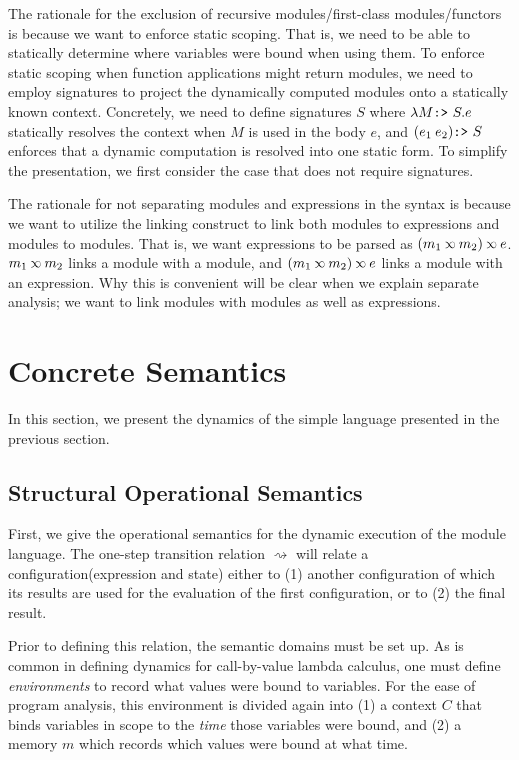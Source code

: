 \documentclass[acmsmall,review]{acmart}\settopmatter{printfolios=true,printccs=false,printacmref=false}
\theoremstyle{definition}
\newcommand*{\mem}{m}
\newcommand*{\semlink}{\mathbin{\rotatebox[origin=c]{180}{$\propto$}}}
\newcommand*{\link}[2]{{#1}\semlink{#2}}
\newcommand*{\project}{\text{\texttt{:>} }}
\begin{document}
The rationale for the exclusion of recursive modules/first-class modules/functors is because we want to enforce static scoping.
That is, we need to be able to statically determine where variables were bound when using them.
To enforce static scoping when function applications might return modules, we need to employ signatures to project the dynamically computed modules onto a statically known context.
Concretely, we need to define signatures $S$ where $\lambda M\project S.e$ statically resolves the context when $M$ is used in the body $e$, and $(e_1\:e_2)\project S$ enforces that a dynamic computation is resolved into one static form.
To simplify the presentation, we first consider the case that does not require signatures.

The rationale for not separating modules and expressions in the syntax is because we want to utilize the linking construct to link both modules to expressions and modules to modules.
That is, we want expressions to be parsed as $\link{(\link{m_1}{m_2})}{e}$.
$\link{m_1}{m_2}$ links a module with a module, and $\link{(\link{m_1}{m_2})}{e}$ links a module with an expression.
Why this is convenient will be clear when we explain separate analysis; we want to link modules with modules as well as expressions.

\section{Concrete Semantics}

In this section, we present the dynamics of the simple language presented in the previous section.

\subsection{Structural Operational Semantics}

First, we give the operational semantics for the dynamic execution of the module language.
The one-step transition relation $\rightsquigarrow$ will relate a configuration(expression and state) either to (1) another configuration of which its results are used for the evaluation of the first configuration, or to (2) the final result.

Prior to defining this relation, the semantic domains must be set up.
As is common in defining dynamics for call-by-value lambda calculus, one must define \emph{environments} to record what values were bound to variables.
For the ease of program analysis, this environment is divided again into (1) a context $C$ that binds variables in scope to the \emph{time} those variables were bound, and (2) a memory $\mem$ which records which values were bound at what time.
\end{document}
